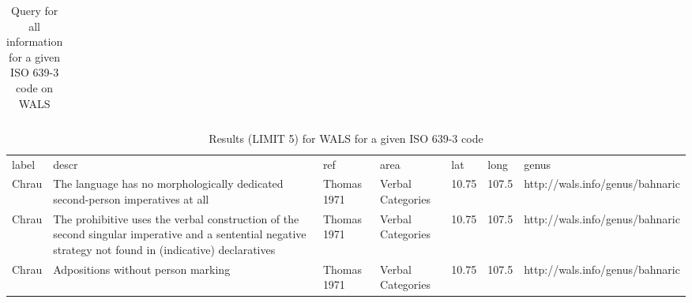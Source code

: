 \begin{table*}
\caption{Query for all information for a given ISO 639-3 code on WALS} \label{t1}
\begin{tabular}{lll}
\hline
{\footnotesize } \\
\hline
\end{tabular}
\end{table*}


\begin{table*}
\caption{Results (LIMIT 5) for WALS for a given ISO 639-3 code} \label{t1}
\begin{tabular}{p{.5cm}p{4cm}p{2cm}p{2cm}p{.5cm}p{.5cm}p{3.5cm}}
\hline
label & descr &ref & area & lat & long &genus \\
Chrau & The language has no morphologically dedicated second-person imperatives at all&Thomas 1971 & Verbal Categories&10.75&107.5&http://wals.info/genus/bahnaric\\
Chrau &The prohibitive uses the verbal construction of the second singular imperative and a sentential negative strategy not found in (indicative) declaratives&Thomas 1971&Verbal Categories&10.75&107.5&http://wals.info/genus/bahnaric \\
Chrau&Adpositions without person marking&Thomas 1971&Verbal Categories&10.75&107.5&http://wals.info/genus/bahnaric \\
\hline
\end{tabular}
\end{table*}



